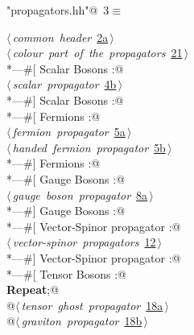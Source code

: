 \documentclass[a4paper,12pt]{amsart}
\renewcommand{\NWtarget}[2]{\hypertarget{#1}{#2}}
\renewcommand{\NWlink}[2]{\hyperlink{#1}{#2}}
\begin{document}
\begin{flushleft} \small\label{scrap3}\raggedright\small
\NWtarget{nuweb3}{} \verb@"propagators.hh"@\nobreak\ {\footnotesize {3}}$\equiv$
\vspace{-1ex}
\begin{list}{}{} \item
\mbox{}\verb@@\hbox{$\langle\,${\itshape common header}\nobreak\ {\footnotesize \NWlink{nuweb2a}{2a}}$\,\rangle$}\verb@@\\
\mbox{}\verb@@\hbox{$\langle\,${\itshape colour part of the propagators}\nobreak\ {\footnotesize \NWlink{nuweb21}{21}}$\,\rangle$}\verb@@\\
\mbox{}\verb@*---#[ Scalar Bosons :@\\
\mbox{}\verb@@\hbox{$\langle\,${\itshape scalar propagator}\nobreak\ {\footnotesize \NWlink{nuweb4b}{4b}}$\,\rangle$}\verb@@\\
\mbox{}\verb@*---#] Scalar Bosons :@\\
\mbox{}\verb@*---#[ Fermions :@\\
\mbox{}\verb@@\hbox{$\langle\,${\itshape fermion propagator}\nobreak\ {\footnotesize \NWlink{nuweb5a}{5a}}$\,\rangle$}\verb@@\\
\mbox{}\verb@@\hbox{$\langle\,${\itshape handed fermion propagator}\nobreak\ {\footnotesize \NWlink{nuweb5b}{5b}}$\,\rangle$}\verb@@\\
\mbox{}\verb@*---#] Fermions :@\\
\mbox{}\verb@*---#[ Gauge Bosons :@\\
\mbox{}\verb@@\hbox{$\langle\,${\itshape gauge boson propagator}\nobreak\ {\footnotesize \NWlink{nuweb8a}{8a}}$\,\rangle$}\verb@@\\
\mbox{}\verb@*---#] Gauge Bosons :@\\
\mbox{}\verb@*---#[ Vector-Spinor propagator :@\\
\mbox{}\verb@@\hbox{$\langle\,${\itshape vector-spinor propagators}\nobreak\ {\footnotesize \NWlink{nuweb12}{12}}$\,\rangle$}\verb@@\\
\mbox{}\verb@*---#] Vector-Spinor propagator :@\\
\mbox{}\verb@*---#[ Tensor Bosons :@\\
\mbox{}\verb@@\hbox{\sffamily\bfseries Repeat}\verb@;@\\
\mbox{}\verb@   @\hbox{$\langle\,${\itshape tensor ghost propagator}\nobreak\ {\footnotesize \NWlink{nuweb18a}{18a}}$\,\rangle$}\verb@@\\
\mbox{}\verb@   @\hbox{$\langle\,${\itshape graviton propagator}\nobreak\ {\footnotesize \NWlink{nuweb18b}{18b}}$\,\rangle$}\verb@@\\

\end{list}
\end{flushleft}
\end{document}
